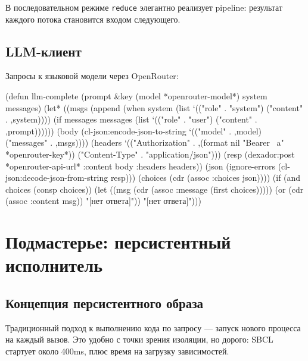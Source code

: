 \documentclass[11pt,a4paper]{article}
\begin{document}
В последовательном режиме \texttt{reduce} элегантно реализует pipeline: результат каждого потока становится входом следующего.

\subsection{LLM-клиент}

Запросы к языковой модели через OpenRouter:

\begin{lispcode}[caption={мастер/cl/llm.lisp}]
(defun llm-complete (prompt &key (model *openrouter-model*)
                               system messages)
  (let* ((msgs (append
                 (when system
                   (list `(("role" . "system")
                           ("content" . ,system))))
                 (if messages messages
                     (list `(("role" . "user")
                             ("content" . ,prompt))))))
         (body (cl-json:encode-json-to-string
                 `(("model" . ,model) ("messages" . ,msgs))))
         (headers `(("Authorization" . ,(format nil "Bearer ~a"
                                         *openrouter-key*))
                    ("Content-Type" . "application/json")))
         (resp (dexador:post *openrouter-api-url*
                :content body :headers headers))
         (json (ignore-errors
                 (cl-json:decode-json-from-string resp)))
         (choices (cdr (assoc :choices json))))
    (if (and choices (consp choices))
        (let ((msg (cdr (assoc :message (first choices)))))
          (or (cdr (assoc :content msg)) "[нет ответа]"))
        "[нет ответа]")))
\end{lispcode}

\section{Подмастерье: персистентный исполнитель}
\label{sec:apprentice}

\subsection{Концепция персистентного образа}

Традиционный подход к выполнению кода по запросу — запуск нового процесса на каждый вызов. Это удобно с точки зрения изоляции, но дорого: SBCL стартует около 400ms, плюс время на загрузку зависимостей.
\end{document}

